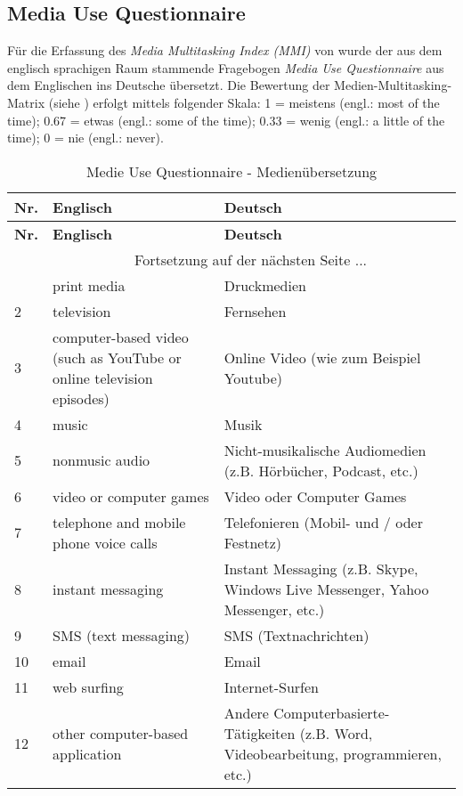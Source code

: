 \begin{RaggedRight}

\section{Media Use Questionnaire}\label{appendix.muq}
Für die Erfassung des \textit{Media Multitasking Index (MMI)} von  wurde der aus dem englisch sprachigen Raum stammende Fragebogen \textit{Media Use Questionnaire} aus dem Englischen ins Deutsche übersetzt.
Die Bewertung der Medien-Multitasking-Matrix (siehe ) erfolgt mittels folgender Skala: 1 = meistens (engl.: most of the time); 0.67 = etwas (engl.: some of the time); 0.33 = wenig (engl.: a little of the time); 0 = nie (engl.: never).  \\

\begin{center}
    \begin{longtable}[t]{|l|p{6.6 cm}|p{6.6 cm}|}
    \caption{Medie Use Questionnaire - Medienübersetzung} \\ \hline
        \textbf{Nr.} & \textbf{Englisch} & \textbf{Deutsch} \\ \hline
        \endfirsthead
        \hline
        \textbf{Nr.} & \textbf{Englisch} & \textbf{Deutsch} \\ \hline
        \endhead 
        & \multicolumn{2}{|c|}{Fortsetzung auf der nächsten Seite $...$ } \\ \hline
        \endfoot
        \hline
        \endlastfoot
        1 & print media & Druckmedien \\
        2 & television & Fernsehen \\
        3 & computer-based video (such as YouTube or online television episodes) & Online Video (wie zum Beispiel Youtube) \\
        4 & music & Musik \\
        5 & nonmusic audio & Nicht-musikalische Audiomedien (z.B. Hörbücher, Podcast, etc.) \\
        6 & video or computer games & Video oder Computer Games \\
        7 & telephone and mobile phone voice calls & Telefonieren (Mobil- und / oder Festnetz) \\
        8 & instant messaging & Instant Messaging (z.B. Skype, Windows Live Messenger, Yahoo Messenger, etc.) \\
        9 & SMS (text messaging) & SMS (Textnachrichten) \\
        10 & email & Email \\
        11 & web surfing & Internet-Surfen \\
        12 & other computer-based application  & Andere Computerbasierte-Tätigkeiten (z.B. Word, Videobearbeitung, programmieren, etc.) \\
        \end{longtable}
	\label{tab.muqUebersetzung}
\end{center}



\end{RaggedRight}
